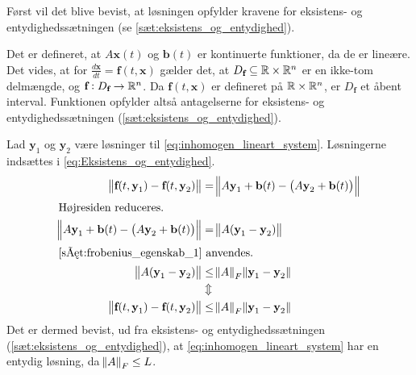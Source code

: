 \begin{bev} \textbf{} %
\newline
Først vil det blive bevist, at løsningen opfylder kravene for eksistens- og entydighedssætningen (se \autoref{sæt:eksistens_og_entydighed}). 

Det er defineret, at $A\textbf{x}(t)$ og $\textbf{b}(t)$ er kontinuerte funktioner, da de er lineære. Det vides, at for
$\displaystyle \frac{d\textbf{x}}{dt}=\textbf{f}(t,\textbf{x})$ gælder det, at $D_\textbf{f} \subseteq \mathbb{R} \times \mathbb{R}^n$ er en ikke-tom delmængde, og $\textbf{f}: D_\textbf{f} \to \mathbb{R}^n$. Da $\textbf{f}(t,\textbf{x})$ er defineret på $\mathbb{R} \times \mathbb{R}^{n}$, er $D_\textbf{f}$ et åbent interval. Funktionen opfylder altså antagelserne for eksistens- og entydighedssætningen (\autoref{sæt:eksistens_og_entydighed}).

Lad $\textbf{y}_1$ og $\textbf{y}_2$ være løsninger til \eqref{eq:inhomogen_lineart_system}.
Løsningerne indsættes i \eqref{eq:Eksistens_og_entydighed}.
%
\begin{align*}
    \norm{\textbf{f}(t, \textbf{y}_1)-\textbf{f}(t, \textbf{y}_2)}
    &=\norm{A\textbf{y}_1+\textbf{b}(t)-\left(A\textbf{y}_2+\textbf{b}(t)\right)}\\
    \intertext{Højresiden reduceres.}
    \norm{A\textbf{y}_1+\textbf{b}(t)-\left(A\textbf{y}_2+\textbf{b}(t)\right)}&=\norm{A(\textbf{y}_1-\textbf{y}_2)}\\
    \intertext{\autoref{sæt:frobenius_egenskab_1} anvendes.}
    \norm{A(\textbf{y}_1-\textbf{y}_2)}&\leq\norm A _F \norm{\textbf{y}_1-\textbf{y}_2}\\
    &\Updownarrow\\
    \norm{\textbf{f}(t, \textbf{y}_1)-\textbf{f}(t, \textbf{y}_2)}&\leq \norm A _F \norm{\textbf{y}_1-\textbf{y}_2}
\end{align*}
Det er dermed bevist, ud fra eksistens- og entydighedssætningen (\autoref{sæt:eksistens_og_entydighed}), at \eqref{eq:inhomogen_lineart_system} har en entydig løsning, da $\norm{A}_F \leq L$.


\end{bev}
